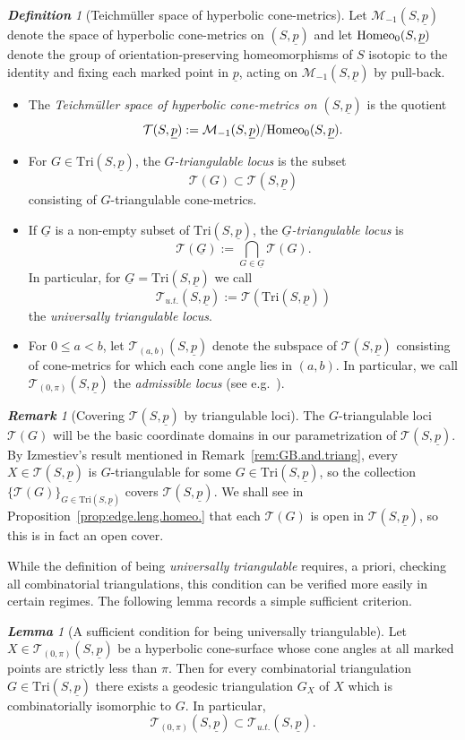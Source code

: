 \documentclass[11pt, letterpaper]{amsart}
\theoremstyle{definition}
\theoremstyle{remark}
\newtheorem{lemma}[theorem]{\rm\bf Lemma}
\newtheorem{definition}[theorem]{\rm\bf Definition}
\newtheorem{remark}[theorem]{\rm\bf Remark}
\newcommand{\up}{\underline{p}}
\newcommand{\Sp}{(S,\up)}
\newcommand{\TSp}{\text{Tri}\Sp}
\newcommand{\cT}{\mathcal{T}}
\newcommand{\cTp}{\mathcal{T} (S,\up)}
\newcommand{\DEF}{} \newcommand{\WARN}{\textcolor{red}} \newcommand{\ALT}{\textcolor{brown}} \newcommand{\TODO}{\textcolor{teal}} %
\numberwithin{equation}{section}
\begin{document}
\begin{definition}[Teichm\"uller space of hyperbolic cone-metrics]
\label{def:Teich.cone.surf.}
Let ${\mathcal{M}}_{-1}(S,\up)$ denote the space of hyperbolic cone-metrics on $(S,\up)$ and let ${\rm Homeo}_0(S,\up)$ denote the group of orientation-preserving homeomorphisms of $S$ isotopic to the identity and fixing each marked point in $\up$, acting on ${\mathcal{M}}_{-1}(S,\up)$ by pull-back.
\begin{itemize}
\item The \DEF{\em Teichm\"uller space of hyperbolic cone-metrics on $\Sp$} is the
quotient
\[
\cTp := {\mathcal{M}}_{-1}(S,\up)/{\rm Homeo}_0(S,\up).
\]
\item For $G\in\TSp$, the \DEF{\em $G$-triangulable locus} is the subset
\[
\cT(G) \subset \cTp
\]
consisting of $G$-triangulable cone-metrics.
\item If $\underline{G}$ is a non-empty subset of $\TSp$, the \DEF{\em
$\underline{G}$-triangulable locus} is
\[
\cT(\underline{G}) := \bigcap_{G\in\underline{G}}\cT(G).
\]
In particular, for $\underline{G}=\TSp$ we call
\[
\cT_{u.t.}\Sp := \cT(\TSp)
\]
the \DEF{\em universally triangulable locus}.
\item For $0\le a<b$, let $\cT_{(a,b)}\Sp$ denote the subspace of $\cTp$ consisting
of cone-metrics for which each cone angle lies in $(a,b)$.  In particular, we call
$\cT_{(0,\pi)}\Sp$ the \DEF{\em admissible locus} (see e.g.~\cite{DP07}).
\end{itemize}
\end{definition}

\begin{remark}[Covering $\cTp$ by triangulable loci]
\label{rem:charts_cover_space}
The $G$-triangulable loci $\cT(G)$ will be the basic coordinate domains in our
parametrization of $\cTp$.  By Izmestiev's result mentioned in
Remark~\ref{rem:GB.and.triang}, every $X\in\cTp$ is $G$-triangulable for some
$G\in\TSp$, so the collection $\{\cT(G)\}_{G\in\TSp}$ covers $\cTp$.  We shall see
in Proposition~\ref{prop:edge.leng.homeo.} that each $\cT(G)$ is open in $\cTp$,
so this is in fact an open cover.
\end{remark}

While the definition of being \emph{universally triangulable} requires, a priori, checking all combinatorial triangulations, this condition can be verified more easily in certain regimes.  
The following lemma records a simple sufficient criterion.

\begin{lemma}[A sufficient condition for being universally triangulable]
\label{lem:adm_universal_triang}
Let \(X\in\cT_{(0,\pi)}\Sp\) be a hyperbolic cone-surface whose cone angles at all
marked points are strictly less than \(\pi\).
Then for every combinatorial triangulation \(G\in\TSp\) there exists a geodesic
triangulation \(G_X\) of \(X\) which is combinatorially isomorphic to \(G\).
In particular,
\[
\cT_{(0,\pi)}\Sp\subset\cT_{u.t.}\Sp.
\]
\end{lemma}
\end{document}
